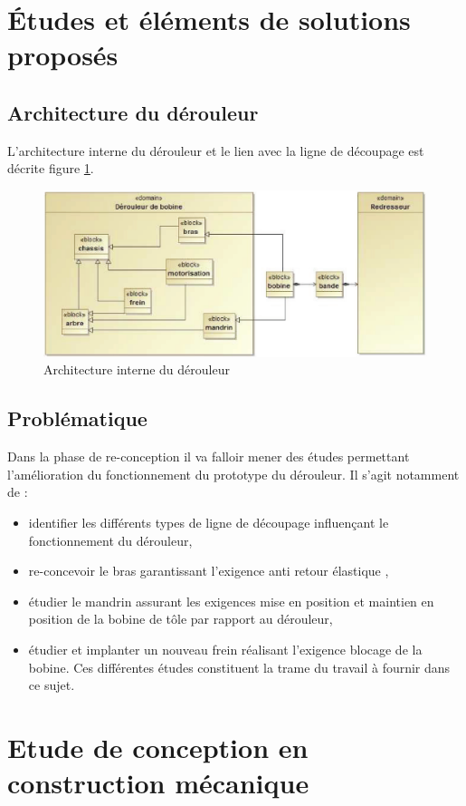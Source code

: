 \section{Études et éléments de solutions proposés}

\subsection{Architecture du dérouleur}

L'architecture interne du dérouleur et le lien avec la ligne de découpage est décrite figure \ref{fig07}.

\begin{figure}[!h]
 \centering\includegraphics[width=0.7\linewidth]{img/fig7}
 \caption{Architecture interne du dérouleur}
 \label{fig07}
\end{figure}

\subsection{Problématique}

Dans la phase de re-conception il va falloir mener des études permettant l'amélioration du
fonctionnement du prototype du dérouleur. Il s'agit notamment de :
\begin{itemize}
 \item identifier les différents types de ligne de découpage influençant le fonctionnement du
dérouleur,
 \item re-concevoir le bras garantissant l'exigence \og anti retour élastique \fg,
 \item étudier le mandrin assurant les exigences \og mise en position \fg et \og maintien en
position \fg de la bobine de tôle par rapport au dérouleur,
 \item  étudier et implanter un nouveau frein réalisant l'exigence \og blocage \fg de la bobine.
Ces différentes études constituent la trame du travail à fournir dans ce sujet.
\end{itemize}

\section{Etude de conception en construction mécanique}

